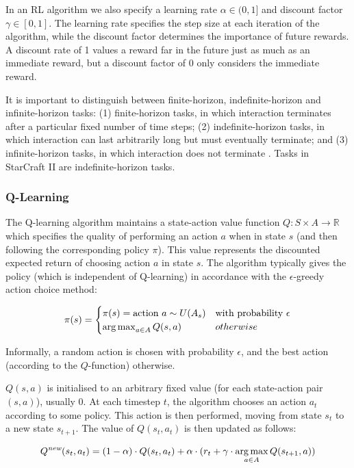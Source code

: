 In an RL algorithm we also specify a learning rate $\alpha \in (0,1]$ and discount factor $\gamma \in [0,1]$. The learning rate specifies the step size at each iteration of the algorithm, while the discount factor determines the importance of future rewards. A discount rate of 1 values a reward far in the future just as much as an immediate reward, but a discount factor of 0 only considers the immediate reward.

It is important to distinguish between finite-horizon, indefinite-horizon and infinite-horizon tasks: (1) finite-horizon tasks, in which interaction terminates after a particular fixed number of time steps; (2) indefinite-horizon tasks, in which interaction can last arbitrarily long but must eventually terminate; and (3) infinite-horizon tasks, in which interaction does not terminate \cite{RLAnIntro}. Tasks in StarCraft II are indefinite-horizon tasks.



\subsubsection{Q-Learning}
The Q-learning algorithm maintains a state-action value function $Q : S \times A \to \mathbb{R}$ which specifies the quality of performing an action $a$ when in state $s$ (and then following the corresponding policy $\pi$). This value represents the discounted expected return of choosing action $a$ in state $s$. The algorithm typically gives the policy (which is independent of Q-learning) in accordance with the $\epsilon$-greedy action choice method:


\[ \pi(s) = \begin{cases} 
      \pi(s) = \text{action } a \sim U(A_s) & \text{with probability $\epsilon$} \\
      \operatorname*{arg\,max}_{a \in A}Q(s,a) & otherwise                         
   \end{cases}
\]

Informally, a random action is chosen with probability $\epsilon$, and the best action (according to the $Q$-function) otherwise.

$Q(s,a)$ is initialised to an arbitrary fixed value (for each state-action pair $(s,a)$), usually $0$. At each timestep $t$, the algorithm chooses an action $a_t$ according to some policy. This action is then performed, moving from state $s_t$ to a new state $s_{t+1}$. The value of $Q(s_t,a_t)$ is then updated as follows:

\[Q^{\textit{new}}(s_t,a_t) = (1-\alpha) \cdot Q(s_t,a_t) + \alpha \cdot (r_t + \gamma \cdot \operatorname*{arg\,max}_{a \in A}Q(s_{t+1},a))\]

